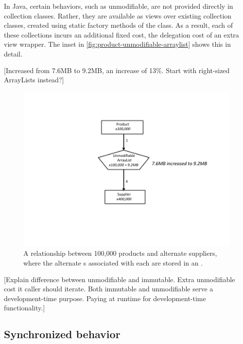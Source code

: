 In Java, certain behaviors, such as unmodifiable, are not provided directly in
collection classes. Rather, they are available as views over existing
collection classes, created using static factory methods of the
 class. As a result, each of these collections incurs an additional fixed cost, the delegation cost of an extra view wrapper. 
The inset in
\autoref{fig:product-unmodifiable-arraylist} shows this in detail.

[Increased from 7.6MB to 9.2MB, an increase of 13\%. 
Start with right-sized ArrayLists instead?]
\begin{figure}
  \centering
 \includegraphics[width=.80\textwidth]{part1/Figures/collections/product-unmodifiable-arraylist.pdf}
 \caption{A relationship between 100,000 products and alternate suppliers,
 where the alternate s associated with each
  are stored in an .}
  \label{fig:product-unmodifiable-arraylist}
\end{figure}

[Explain difference between unmodifiable and immutable.  Extra unmodifiable
cost it caller should iterate.  Both immutable and unmodifiable serve a
development-time purpose.  Paying at runtime for development-time
functionality.]


\subsection{Synchronized behavior}
\label{sec:synchronized-collections}

